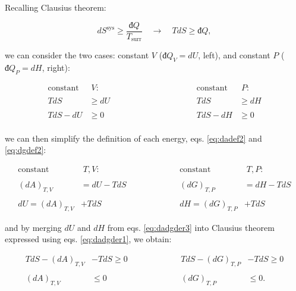 \documentclass[
  9pt,
]{extbook}
\theoremstyle{definition}
\theoremstyle{definition}
\theoremstyle{definition}
\theoremstyle{definition}
\theoremstyle{remark}
\begin{document}
Recalling Clausius theorem:

\begin{equation}
d S^{\mathrm{sys}} \geq \frac{đQ}{T_{\text{surr}}} \quad \longrightarrow \quad TdS \geq đQ,
\label{eq:dssyscrit}
\end{equation}

we can consider the two cases: constant \(V\) (\(đQ_V=dU\), left), and constant \(P\) (\(đQ_P=dH\), right):

\begin{equation}
\begin{aligned}
\text{constant} & \; V:           & \qquad \qquad & \qquad \qquad &     \text{constant} & \; P: \\
\\
TdS & \geq dU           & &   &     TdS & \geq dH \\
\\
TdS -dU & \geq 0         & &   &      TdS -dH & \geq 0 \\
\end{aligned}
\label{eq:dadgder1}
\end{equation}

we can then simplify the definition of each energy, eqs. \eqref{eq:dadef2} and \eqref{eq:dgdef2}:

\begin{equation}
\begin{aligned}
\text{constant} & \; T,V:           & \qquad & \qquad &     \text{constant} & \; T,P: \\
\\
(dA)_{T,V} &= dU -TdS     & &   &       (dG)_{T,P} &= dH - TdS \\ 
\\
dU = (dA)_{T,V} &+TdS       & &   &       dH = (dG)_{T,P} &+TdS
\end{aligned}
\label{eq:dadgder3}
\end{equation}

and by merging \(dU\) and \(dH\) from eqs. \eqref{eq:dadgder3} into Clausius theorem expressed using eqs. \eqref{eq:dadgder1}, we obtain:

\begin{equation}
\begin{aligned}
TdS -(dA)_{T,V} &- TdS \geq 0 & \qquad & \qquad & TdS -(dG)_{T,P} &- TdS \geq 0 \\
\\
(dA)_{T,V} & \leq 0 & \qquad & \qquad & (dG)_{T,P} & \leq 0. \\
\end{aligned}
\label{eq:dadgcond}
\end{equation}
\end{document}
